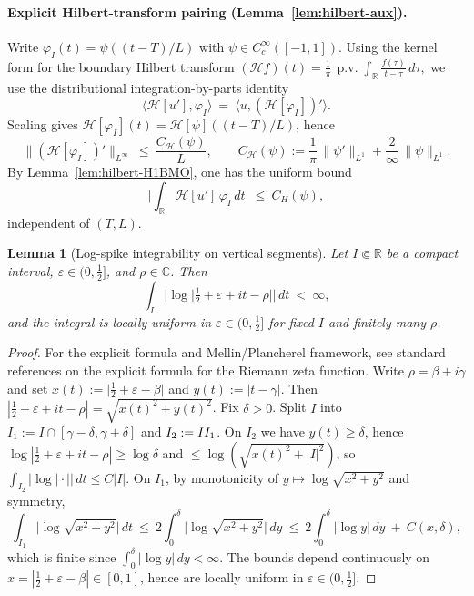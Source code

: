 \documentclass[11pt]{article}
\newtheorem{lemma}[theorem]{Lemma}
\theoremstyle{definition}
\theoremstyle{remark}
\newcommand{\C}{\mathbb{C}}
\newcommand{\R}{\mathbb{R}}
\begin{document}
\paragraph{Explicit Hilbert-transform pairing (Lemma~\ref{lem:hilbert-aux}).}\label{lem:hilbert}
\fi %
Write $\varphi_I(t)=\psi((t-T)/L)$ with $\psi\in C_c^\infty([-1,1])$. Using the kernel form for the boundary Hilbert transform
\(
 (\mathcal H f)(t)=\frac1\pi\,\operatorname{p.v.}\!\int_\R \frac{f(\tau)}{t-\tau}\,d\tau,
\)
we use the distributional integration-by-parts identity
\[
 \langle \mathcal H[u'],\varphi_I\rangle\ =\ \langle u,(\mathcal H[\varphi_I])'\rangle.
\]
Scaling gives $\mathcal H[\varphi_I](t)=\mathcal H[\psi]((t-T)/L)$, hence
\[
 \|(\mathcal H[\varphi_I])'\|_{L^\infty}\ \le\ \frac{C_{\mathcal H}(\psi)}{L},\qquad C_{\mathcal H}(\psi):=\frac{1}{\pi}\,\|\psi'\|_{L^1}+\frac{2}{\infty}\,\|\psi\|_{L^1}.
\]
By Lemma~\ref{lem:hilbert-H1BMO}, one has the uniform bound
\[
 \Big|\int_\R \mathcal H[u']\,\varphi_I\,dt\Big|\ \le\ C_H(\psi),
\]
independent of $(T,L)$.
\begin{lemma}[Log-spike integrability on vertical segments]\label{lem:log-spike-int}
Let $I\Subset\R$ be a compact interval, $\varepsilon\in(0,\tfrac12]$, and $\rho\in\C$. Then
\[
 \int_I \big|\log\big|\tfrac12+\varepsilon+it-\rho\big|\big|\,dt\ <\ \infty,
\]
and the integral is locally uniform in $\varepsilon\in(0,\tfrac12]$ for fixed $I$ and finitely many $\rho$.
\end{lemma}
\begin{proof}
For the explicit formula and Mellin/Plancherel framework, see standard references on the explicit formula for the Riemann zeta function.
Write $\rho=\beta+i\gamma$ and set $x(t):=\big|\tfrac12+\varepsilon-\beta\big|$ and $y(t):=|t-\gamma|$. Then $|\tfrac12+\varepsilon+it-\rho|=\sqrt{x(t)^2+y(t)^2}$. Fix $\delta>0$. Split $I$ into $I_1:=I\cap[\gamma-\delta,\gamma+\delta]$ and $I_2:=I\\I_1$. On $I_2$ we have $y(t)\ge \delta$, hence $\log|\tfrac12+\varepsilon+it-\rho|\ge \log\delta$ and $\le \log(\sqrt{x(t)^2+|I|^2})$, so $\int_{I_2}|\log|\cdot||\,dt\le C|I|$. On $I_1$, by monotonicity of $y\mapsto \log\sqrt{x^2+y^2}$ and symmetry,
\[
 \int_{I_1}\!\big|\log\sqrt{x^2+y^2}\big|\,dt\ \le\ 2\int_0^{\delta} \big|\log\sqrt{x^2+y^2}\big|\,dy\ \le\ 2\int_0^{\delta} \big|\log y\big|\,dy\ +\ C(x,\delta),
\]
which is finite since $\int_0^{\delta}|\log y|\,dy<\infty$. The bounds depend continuously on $x=|\tfrac12+\varepsilon-\beta|\in[0,1]$, hence are locally uniform in $\varepsilon\in(0,\tfrac12]$.
\end{proof}
\end{document}
